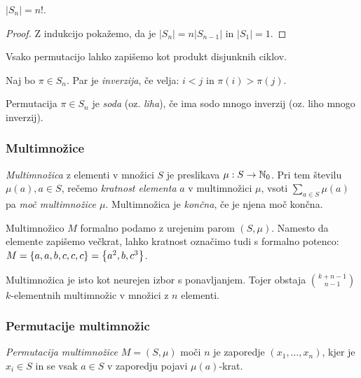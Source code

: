 \begin{trditev}
    $|S_n| = n!$.
\end{trditev}

\begin{proof}
    Z indukcijo pokažemo, da je $|S_n| = n|S_{n-1}|$ in $|S_1| = 1$.
\end{proof}

\begin{trditev}
    Vsako permutacijo lahko zapišemo kot produkt disjunknih ciklov.
\end{trditev}

\begin{definicija}
    Naj bo $\pi \in S_n$. Par je \emph{inverzija}, če velja: $i < j$ in $\pi(i) > \pi(j)$.
\end{definicija}

\begin{definicija}
    Permutacija $\pi \in S_n$ je \emph{soda} (oz. \emph{liha}), če ima sodo mnogo inverzij (oz. liho mnogo inverzij).
\end{definicija}

\subsubsection{Multimnožice}
\begin{definicija}
    \emph{Multimnožica} z elementi v množici $S$ je preslikava $\mu: S \to \mathbb{N}_0$. Pri tem številu $\mu(a), a \in S$, rečemo \emph{kratnost elementa} $a$ v multimnožici $\mu$, vsoti $\sum_{a \in S} \mu(a)$ pa \emph{moč multimnožice $\mu$}. Multimnožica je \emph{končna}, če je njena moč končna.
\end{definicija}

\begin{opomba}
    Multimnožico $M$ formalno podamo z urejenim parom $(S, \mu)$. Namesto da elemente zapišemo večkrat, lahko kratnost označimo tudi s formalno potenco: $M = \left\{a, a, b, c, c, c\right\} = \left\{a^2, b, c^3\right\}$.

    Multimnožica je isto kot neurejen izbor s ponavljanjem. Tojer obstaja $\binom{k+n-1}{n-1}$ $k$-elementnih multimnožic v množici z $n$ elementi.
\end{opomba}

\subsubsection{Permutacije multimnožic}
\begin{definicija}
    \emph{Permutacija multimnožice} $M = (S, \mu)$ moči $n$ je zaporedje $(x_1, \ldots, x_n)$, kjer je $x_i \in S$ in se vsak $a \in S$ v zaporedju pojavi $\mu(a)$-krat.
\end{definicija}

